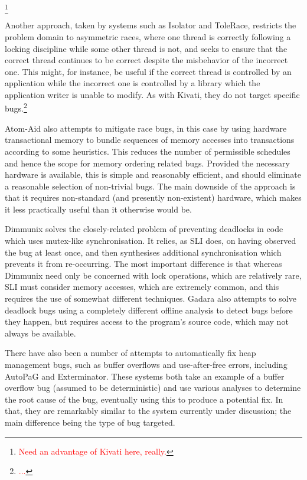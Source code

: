 \documentclass[10pt,twocolumn,preprint,natbib,authoryear]{sigplanconf}
\newcommand{\editorial}[1]{\textcolor{red}{\footnote{\textcolor{red}{#1}}}}
\begin{document}
\editorial{Need an advantage of Kivati here, really.}

Another approach, taken by systems such as Isolator
\cite{Ramalingam2009} and ToleRace\cite{Ratanaworabhan2008}, restricts
the problem domain to asymmetric races, where one thread is correctly
following a locking discipline while some other thread is not, and
seeks to ensure that the correct thread continues to be correct
despite the misbehavior of the incorrect one.  This might, for
instance, be useful if the correct thread is controlled by an
application while the incorrect one is controlled by a library which
the application writer is unable to modify.  As with Kivati, they do
not target specific bugs.\editorial{...}

Atom-Aid\cite{Lucia2009} also attempts to mitigate race bugs, in
this case by using hardware transactional memory to
bundle sequences of memory accesses into
transactions according to some heuristics.  This reduces the
number of permissible schedules and hence the scope for memory
ordering related bugs.  Provided the necessary hardware is available,
this is simple and reasonably efficient, and should eliminate a
reasonable selection of non-trivial bugs.  The main downside of the
approach is that it requires non-standard (and presently non-existent)
hardware, which makes it less practically useful than it otherwise
would be.

Dimmunix\cite{Jula2008} solves the closely-related problem of
preventing deadlocks in code which uses mutex-like synchronisation.
It relies, as SLI does, on having observed the bug at least once, and
then synthesises additional synchronisation which prevents it from
re-occurring.  The most important difference is that whereas Dimmunix
need only be concerned with lock operations, which are relatively
rare, SLI must consider memory accesses, which are extremely common,
and this requires the use of somewhat different techniques.
Gadara\cite{Wang2008} also attempts to solve deadlock bugs using a
completely different offline analysis to detect bugs before they
happen, but requires access to the program's source code, which may
not always be available.

There have also been a number of attempts to automatically fix heap
management bugs, such as buffer overflows and use-after-free errors,
including AutoPaG\cite{Lin2007} and Exterminator\cite{Novark2007}.
These systems both take an example of a buffer overflow bug (assumed
to be deterministic) and use various analyses to determine the root
cause of the bug, eventually using this to produce a potential fix.
In that, they are remarkably similar to the system currently under
discussion; the main difference being the type of bug targeted.
\end{document}
